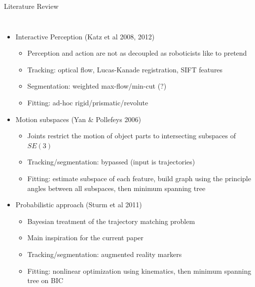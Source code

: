 \documentclass{beamer}
\begin{document}
    \begin{frame}{Literature Review}
      \begin{columns}[t]
        \begin{itemize}[<+->]
          \small
          \vspace{-.2in}
          \pause
          \item Interactive Perception (Katz et al 2008, 2012)
            \begin{itemize}
              \scriptsize
              \item Perception and action are not as decoupled as roboticists like to pretend
              \item Tracking: optical flow, Lucas-Kanade registration, SIFT features
              \item Segmentation: weighted max-flow/min-cut (?)
              \item Fitting: ad-hoc rigid/prismatic/revolute
            \end{itemize}
          \item Motion subspaces (Yan \& Pollefeys 2006)
            \begin{itemize}
              \scriptsize
              \item Joints restrict the motion of object parts to intersecting subspaces of $SE(3)$
              \item Tracking/segmentation: bypassed (input is trajectories)
              \item Fitting: estimate subspace of each feature, build graph using the principle angles between all subspaces, then minimum spanning tree
            \end{itemize}
          \item Probabilistic approach (Sturm et al 2011)
            \begin{itemize}
              \scriptsize
              \item Bayesian treatment of the trajectory matching problem
              \item Main inspiration for the current paper
              \item Tracking/segmentation: augmented reality markers
              \item Fitting: nonlinear optimization using kinematics, then minimum spanning tree on BIC
            \end{itemize}
        \end{itemize}


\end{columns}
\end{frame}
\end{document}
